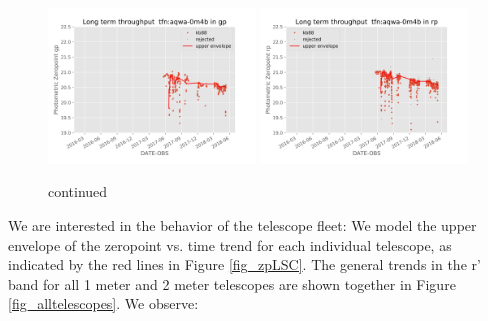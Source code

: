 \documentclass[]{spieman}
\begin{document}
\begin{figure}
\includegraphics[width=0.49\textwidth]{images/photzptrend-tfn-aqwa-0m4b-gp.png} \hspace*{\fill}
\includegraphics[width=0.49\textwidth]{images/photzptrend-tfn-aqwa-0m4b-rp.png} \\[1ex]
\caption {continued}
\end{figure}


We are interested in the behavior of the telescope fleet: We model the upper
envelope of the zeropoint vs. time trend for each individual telescope, as indicated by the red
lines in Figure \ref{fig_zpLSC}. The general trends in the r' band for all 1 meter and 2 meter telescopes
are shown together in Figure \ref{fig_alltelescopes}. We observe:
\end{document}
